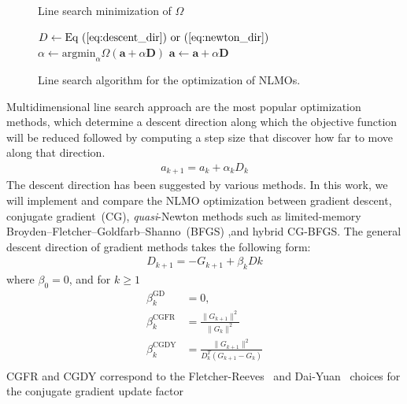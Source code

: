 \documentclass[aps,prl,reprint,amsmath,amssymb]{revtex4-1}
\begin{document}
\begin{figure}
\begin{algorithm}[H]
  \caption{Line search minimization of $\Omega$}
  \label{alg:ls}
   \begin{algorithmic}[1]
	\State $D \gets  \text{Eq~(\ref{eq:descent_dir}) or~(\ref{eq:newton_dir})}$
	\State $\alpha \gets \text{argmin}_{\alpha} \Omega(\mathbf{a} + \alpha \mathbf{D})$ 
	\State $\mathbf{a}\gets \mathbf{a} + \alpha \mathbf{D}$ 
   \end{algorithmic}
\end{algorithm}
\caption{\label{fig:ls} Line search algorithm for the optimization of NLMOs.}
\end{figure}
Multidimensional line search approach are the most popular optimization methods, which determine a descent direction along which the objective function will be reduced followed by computing a step size that discover how far to move along that direction.
%
\begin{equation} \label{eq:LS_methods}
\begin{split} 
a_{k+1} = a_{k} + \alpha_{k}D_{k}
\end{split}
\end{equation}
%
The descent direction has been suggested by various methods. In this work, we will implement and compare the NLMO optimization between gradient descent, conjugate gradient~(CG),  \emph{quasi}-Newton methods such as limited-memory Broyden–Fletcher–Goldfarb–Shanno~(BFGS) ,and hybrid CG-BFGS. The general descent direction of gradient methods takes the following form:
%
\begin{equation} \label{eq:descent_dir}
\begin{split}
D_{k+1} = -G_{k+1} + \beta_k D{k}
\end{split}
\end{equation}
%
where  $\beta_0=0$, and for $k \geq 1$
\begin{equation} \label{eq:beta}
\begin{split}
\beta_{k}^\text{GD} &= 0, \\
\beta_{k}^\text{CGFR} &= \frac{\lVert{G_{k+1}}\rVert^2}{\lVert{G_{k}}\rVert^2} \\
\beta_{k}^\text{CGDY} &=  \frac{\lVert{G_{k+1}}\rVert^2}{D_{k}^{T}(G_{k+1}-G_{k})} \\
\end{split}
\end{equation}
%
CGFR and CGDY correspond to the Fletcher-Reeves~\citep{fletcher1964function}  and Dai-Yuan~\cite{dai1999nonlinear} choices for the conjugate gradient update factor
\end{document}
